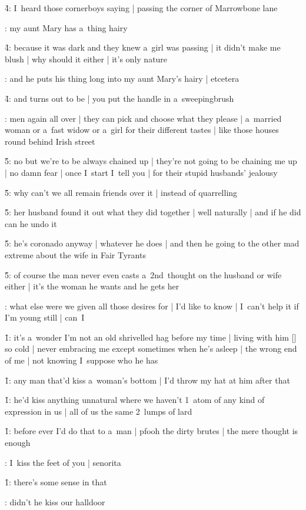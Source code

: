 \f4:
I~heard those cornerboys saying |
passing the corner of Marrowbone lane

:
my aunt Mary has a~thing hairy

\f4:
because it was dark and they knew a~girl was passing |
it didn't make me blush |
why should it either |
it's only nature

:
and he puts his thing long into my aunt Mary's hairy |
etcetera

\f4:
and turns out to be |
you put the handle in a~sweepingbrush

:
men again all over |
they can pick and choose what they please |
a~married woman or a~fast widow or a~girl for their different tastes |
like those houses round behind Irish street

\f5:
no but we're to be always chained up |
they're not going to be chaining me up |
no damn fear |
once I~start I~tell you |
for their stupid husbands' jealousy

\f5:
why can't we all remain friends over it |
instead of quarrelling

\f5:
her husband found it out what they did together |
well naturally |
and if he did
can he undo it

\f5:
he's coronado anyway |
whatever he does |
and then he going to the other mad extreme about the wife in Fair Tyrants

\f5:
of course the man never even casts a~2nd~thought
on the husband or wife either |
it's the woman he wants and he gets her

:
what else were we given all those desires for |
I'd like to know |
I~can't help it if I'm young still |
can~I

\f1:
it's a~wonder I'm not an old shrivelled hag before my time |
living with him [\bloom] so cold |
never embracing me except sometimes when he's asleep |
the wrong end of me |
not knowing I~suppose who he has

\f1:
any man that'd kiss a~woman's bottom |
I'd throw my hat at him after that

\f1:
he'd kiss anything unnatural
where we haven't 1~atom of any kind of expression in us |
all of us the same 2~lumps of lard

\f1:
before ever I'd do that to a~man |
pfooh the dirty brutes |
the mere thought is enough

:
I~kiss the feet of you |
senorita

\f1:
there's some sense in that

:
didn't he kiss our halldoor

